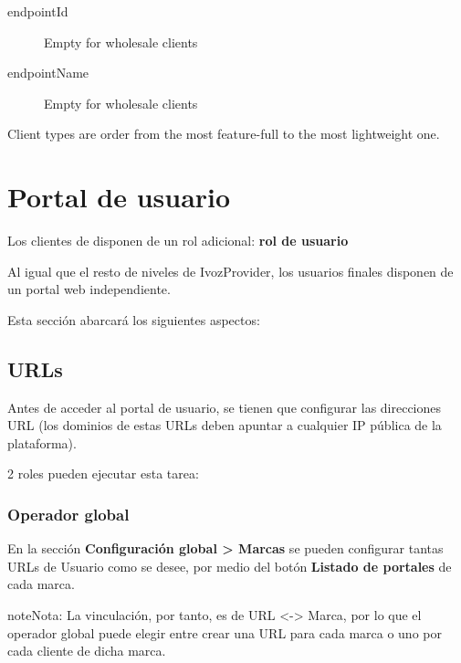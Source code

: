 \documentclass[letterpaper,10pt,spanish]{sphinxmanual}
\begin{document}
\begin{description}
\item[{endpointId}] \leavevmode{}\label{administration_portal/client/wholesale/calls/call_csv_schedulers:term-endpointid}
Empty for wholesale clients

\item[{endpointName}] \leavevmode{}\label{administration_portal/client/wholesale/calls/call_csv_schedulers:term-endpointname}
Empty for wholesale clients

\end{description}

Client types are order from the most feature-full to the most lightweight one.


\chapter{Portal de usuario}
\label{user_portal/index:userportal}\label{user_portal/index:user-portal}\label{user_portal/index::doc}
Los clientes de {\hyperref[administration_portal/brand/clients/virtual_pbx:virtual\string-pbx]{}} disponen de un rol adicional: \textbf{rol de usuario}

Al igual que el resto de niveles de IvozProvider, los usuarios finales disponen de un portal web independiente.

Esta sección abarcará los siguientes aspectos:


\section{URLs}
\label{user_portal/urls::doc}\label{user_portal/urls:urls}
Antes de acceder al portal de usuario, se tienen que configurar las direcciones URL (los dominios de estas URLs deben apuntar a cualquier IP pública de la plataforma).

2 roles pueden ejecutar esta tarea:


\subsection{Operador global}
\label{user_portal/urls:god-operator}
En la sección \textbf{Configuración global \textgreater{} Marcas} se pueden configurar tantas URLs de Usuario como se desee, por medio del botón \textbf{Listado de portales} de cada marca.

\begin{notice}{note}{Nota:}
La vinculación, por tanto, es de URL \textless{}-\textgreater{} Marca, por lo que el operador global puede elegir entre crear una URL para cada marca o uno por cada cliente de dicha marca.
\end{notice}
\end{document}
